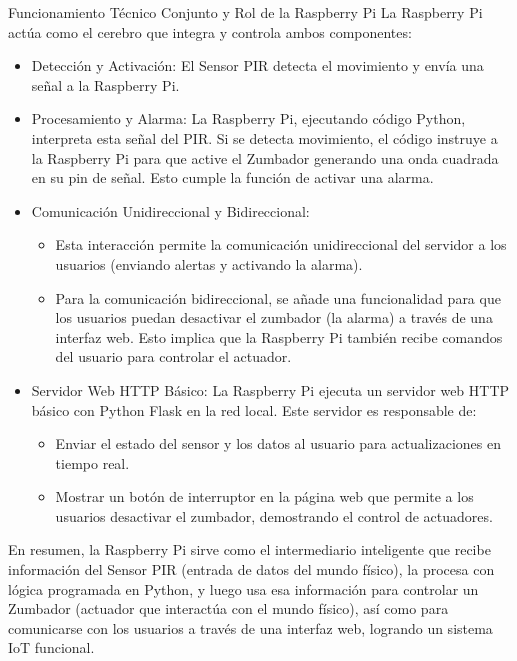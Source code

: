 \documentclass{report}
\begin{document}
Funcionamiento Técnico Conjunto y Rol de la Raspberry Pi
La Raspberry Pi actúa como el cerebro que integra y controla ambos componentes:
\begin{itemize}
    \item Detección y Activación: El Sensor PIR detecta el movimiento y envía una señal a la Raspberry Pi.
    \item Procesamiento y Alarma: La Raspberry Pi, ejecutando código Python, interpreta esta señal del PIR. Si se detecta movimiento, 
    el código instruye a la Raspberry Pi para que active el Zumbador generando una onda cuadrada en su pin de señal. Esto cumple la 
    función de activar una alarma.

    \item Comunicación Unidireccional y Bidireccional:
    \begin{itemize}
        \item Esta interacción permite la comunicación unidireccional del servidor a los usuarios (enviando alertas y activando la alarma).
        \item Para la comunicación bidireccional, se añade una funcionalidad para que los usuarios puedan desactivar el zumbador (la alarma) 
        a través de una interfaz web. Esto implica que la Raspberry Pi también recibe comandos del usuario para controlar el actuador.
    \end{itemize}

    \item Servidor Web HTTP Básico: La Raspberry Pi ejecuta un servidor web HTTP básico con Python Flask en la red local. Este servidor es responsable de:
    \begin{itemize}
        \item Enviar el estado del sensor y los datos al usuario para actualizaciones en tiempo real.
        \item Mostrar un botón de interruptor en la página web que permite a los usuarios desactivar el zumbador, 
        demostrando el control de actuadores.
    \end{itemize}
\end{itemize}
En resumen, la Raspberry Pi sirve como el intermediario inteligente que recibe información del Sensor PIR (entrada de datos del mundo 
físico), la procesa con lógica programada en Python, y luego usa esa información para controlar un Zumbador (actuador que interactúa con 
el mundo físico), así como para comunicarse con los usuarios a través de una interfaz web, logrando un sistema IoT funcional.
\end{document}
